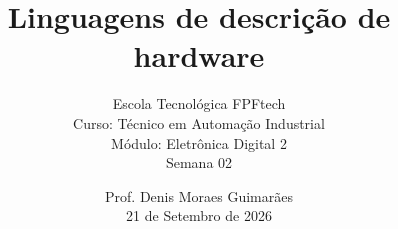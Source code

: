 
\title{Linguagens de descrição de hardware}

\subtitle{\texorpdfstring{%
Escola Tecnológica FPFtech\\[0.3cm]
Curso: Técnico em Automação Industrial\\[0.3cm]
Módulo: Eletrônica Digital 2\\[0.2cm]
Semana 02
}{Escola Tecnológica FPFtech — Curso: Técnico em Automação Industrial — Módulo: Eletrônica Digital 2}}

\author{\texorpdfstring{%
Prof. Denis Moraes Guimarães\\
\small 21 de Setembro de 2026
}{Prof. Denis Moraes Guimarães}}

\date{}
